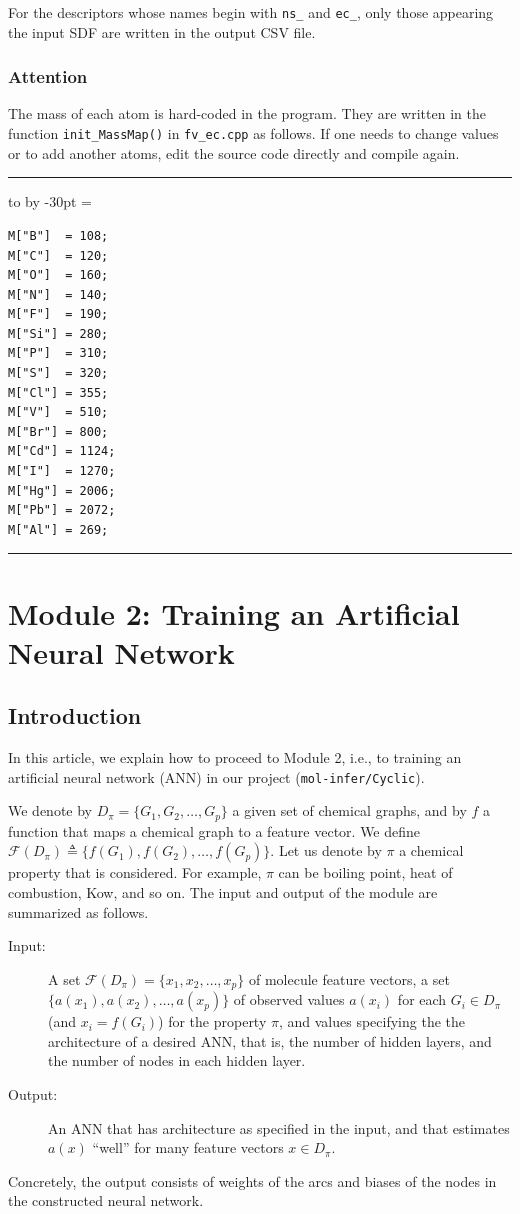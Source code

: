 \documentclass[11pt,titlepage,dvipdfmx,twoside]{book}
\newenvironment{myframe}{\begin{trivlist}\item[]
    \hrule
    \hbox to \linewidth\bgroup
    \advance\linewidth by -30pt
    \hsize=\linewidth
    \vrule\hfill
    \vbox\bgroup
    \vskip15pt
    \def\thempfootnote{\arabic{mpfootnote}}
    \begin{minipage}{\linewidth}}{%
    \end{minipage}\vskip15pt
    \egroup\hfill\vrule
    \egroup\hrule
\end{trivlist}}
\newcommand{\project}{{\tt mol-infer/Cyclic}}
\begin{document}
For the descriptors whose names begin with {\tt ns\_} and {\tt ec\_},
only those appearing the input SDF
are written in the output CSV file. 

\subsection{Attention}
\label{sec:caution}

The mass of each atom is hard-coded in the program.
They are written in the function {\tt init\_MassMap()}
in {\tt fv\_ec.cpp} as follows.
If one needs to change values or to add another atoms,
edit the source code directly and compile again.

\begin{myframe}
\begin{verbatim}
M["B"]  = 108;
M["C"]  = 120;
M["O"]  = 160;
M["N"]  = 140;
M["F"]  = 190;
M["Si"] = 280;
M["P"]  = 310;
M["S"]  = 320;
M["Cl"] = 355;
M["V"]  = 510;
M["Br"] = 800;
M["Cd"] = 1124;
M["I"]  = 1270;
M["Hg"] = 2006;
M["Pb"] = 2072;
M["Al"] = 269;
\end{verbatim}
\end{myframe}


\chapter{Module 2:
Training an Artificial Neural Network
}


\section{Introduction}
In this article,
we explain how to proceed to  Module 2, 
i.e., to training an artificial neural network (ANN)
in our project (\project).

We denote by $D_\pi=\{G_1,G_2,\dots,G_p\}$ a given set of chemical graphs,
and by $f$ a function that maps a chemical graph to a feature vector.
We define ${\mathcal F}(D_\pi)\triangleq\{f(G_1),f(G_2),\dots,f(G_p)\}$. 
Let us denote by $\pi$ a chemical property that is considered.
For example, $\pi$ can be boiling point, heat of combustion, Kow, and so on. 
The input and output of the module are summarized as follows.

\begin{oframed}
\begin{description}
\item[Input:] 
A set ${\mathcal F}(D_\pi)=\{x_1, x_2,\dots, x_p\}$ of molecule feature vectors,
  a set $\{a(x_1), a(x_2), \dots, a(x_p)\}$ of observed values $a(x_i)$ for 
  each $G_i\in D_\pi$ (and $x_i=f(G_i)$)
  for the property $\pi$,
  and values specifying the the architecture of a desired  ANN,
  that is, the number of hidden layers, 
  and the number of nodes in each hidden layer. 
\item[Output:] 
An ANN that
  has architecture as specified in the input,
  and that estimates $a(x)$ ``well'' for many feature vectors $x \in D_\pi$. 
\end{description}
\end{oframed}
%
Concretely, the output consists of weights of the arcs
and biases of the nodes in the constructed neural network. 
\end{document}
